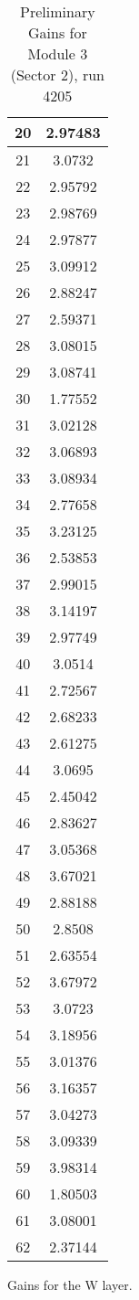 \begin{table}[h]
\begin{subtable}[h]{2in}
{\begin{tabular}{|c|c|}
20	&	2.97483	\\	\hline
21	&	3.0732	\\	\hline
22	&	2.95792	\\	\hline
23	&	2.98769	\\	\hline
24	&	2.97877	\\	\hline
25	&	3.09912	\\	\hline
26	&	2.88247	\\	\hline
27	&	2.59371	\\	\hline
28	&	3.08015	\\	\hline
29	&	3.08741	\\	\hline
30	&	1.77552	\\	\hline
31	&	3.02128	\\	\hline
32	&	3.06893	\\	\hline
33	&	3.08934	\\	\hline
34	&	2.77658	\\	\hline
35	&	3.23125	\\	\hline
36	&	2.53853	\\	\hline
37	&	2.99015	\\	\hline
38	&	3.14197	\\	\hline
39	&	2.97749	\\	\hline
40	&	3.0514	\\	\hline
41	&	2.72567	\\	\hline
42	&	2.68233	\\	\hline
43	&	2.61275	\\	\hline
44	&	3.0695	\\	\hline
45	&	2.45042	\\	\hline
46	&	2.83627	\\	\hline
47	&	3.05368	\\	\hline
48	&	3.67021	\\	\hline
49	&	2.88188	\\	\hline
50	&	2.8508	\\	\hline
51	&	2.63554	\\	\hline
52	&	3.67972	\\	\hline
53	&	3.0723	\\	\hline
54	&	3.18956	\\	\hline
55	&	3.01376	\\	\hline
56	&	3.16357	\\	\hline
57	&	3.04273	\\	\hline
58	&	3.09339	\\	\hline
59	&	3.98314	\\	\hline
60	&	1.80503	\\	\hline
61	&	3.08001	\\	\hline
62	&	2.37144	\\	\hline
        \end{tabular}
        }
        \caption{Gains for the W layer.}
    \end{subtable}
    \caption{Preliminary Gains for Module 3 (Sector 2), run 4205}
\end{table}

